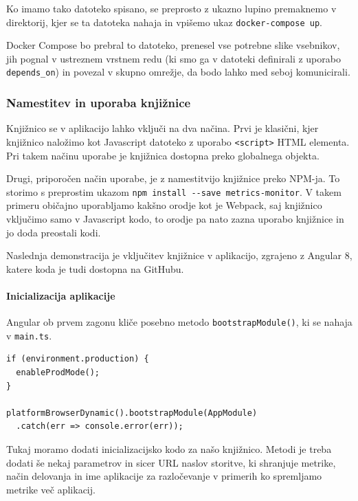 \documentclass[a4paper, 12pt]{book}
\begin{document}
Ko imamo tako datoteko spisano, se preprosto z ukazno lupino premaknemo v direktorij, kjer se ta datoteka nahaja in vpišemo ukaz \verb|docker-compose up|.

Docker Compose bo prebral to datoteko, prenesel vse potrebne slike vsebnikov, jih pognal v ustreznem vrstnem redu (ki smo ga v datoteki definirali z uporabo \verb|depends_on|) in povezal v skupno omrežje, da bodo lahko med seboj komunicirali.

\subsubsection{Namestitev in uporaba knjižnice}

Knjižnico se v aplikacijo lahko vključi na dva načina. Prvi je klasični, kjer knjižnico naložimo kot Javascript datoteko z uporabo \verb|<script>| HTML elementa. Pri takem načinu uporabe je knjižnica dostopna preko globalnega objekta.

Drugi, priporočen način uporabe, je z namestitvijo knjižnice preko NPM-ja. To storimo s preprostim ukazom \verb|npm install --save metrics-monitor|. V takem primeru običajno uporabljamo kakšno orodje kot je Webpack, saj knjižnico vključimo samo v Javascript kodo, to orodje pa nato zazna uporabo knjižnice in jo doda preostali kodi.

Naslednja demonstracija je vključitev knjižnice v aplikacijo, zgrajeno z Angular 8, katere koda je tudi dostopna na GitHubu.

\paragraph{Inicializacija aplikacije} 
Angular ob prvem zagonu kliče posebno metodo \verb|bootstrapModule()|, ki se nahaja v \verb|main.ts|.

\begin{lstlisting}[label=code:lib_main_ts, caption=Zagon Angular aplikacije]
if (environment.production) {
  enableProdMode();
}

platformBrowserDynamic().bootstrapModule(AppModule)
  .catch(err => console.error(err));
\end{lstlisting}

Tukaj moramo dodati inicializacijsko kodo za našo knjižnico. Metodi je treba dodati še nekaj parametrov in sicer URL naslov storitve, ki shranjuje metrike, način delovanja in ime aplikacije za razločevanje v primerih ko spremljamo metrike več aplikacij. \\
\end{document}
